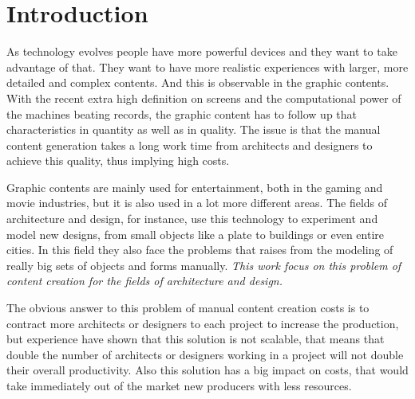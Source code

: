 
% 
% 

\section{Introduction}



As technology evolves people have more powerful devices and they want to take advantage of that. They want to have more realistic experiences with larger, more detailed and complex contents.
And this is observable in the graphic contents. With the recent extra high definition on screens and the computational power of the machines beating records, the graphic content has to follow up that characteristics in quantity as well as in quality. The issue is that the manual content generation takes a long work time from architects and designers to achieve this quality, thus implying high costs.

Graphic contents are mainly used for entertainment, both in the gaming and movie industries, but it is also used in a lot more different areas. The fields of architecture and design, for instance, use this technology to experiment and model new designs, from small objects like a plate to buildings or even entire cities. In this field they also face the problems that raises from the modeling of really big sets of objects and forms manually. \emph{This work focus on this problem of content creation for the fields of architecture and design.}

The obvious answer to this problem of manual content creation costs is to contract more architects or designers to each project to increase the production, but experience have shown that this solution is not scalable, that means that double the number of architects or designers working in a project will not double their overall productivity. Also this solution has a big impact on costs, that would take immediately out of the market new producers with less resources.

